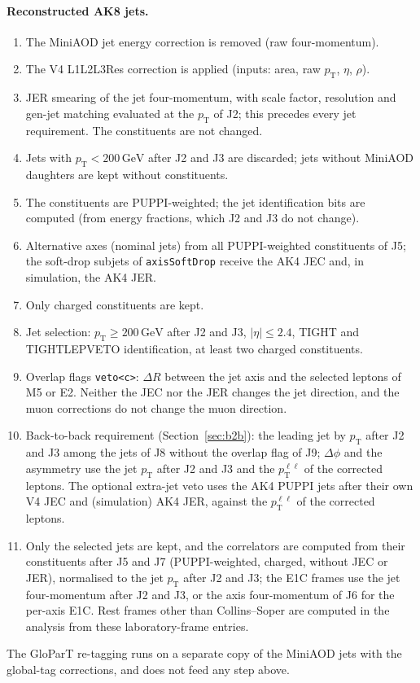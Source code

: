 \documentclass[11pt]{article}
\newcommand{\pt}{p_{\mathrm{T}}}
\newcommand{\GeV}{\ensuremath{\,\mathrm{GeV}}}
\newcommand{\ptll}{\pt^{\ell\ell}}
\newcommand{\code}[1]{\texttt{#1}}
\begin{document}
\paragraph{Reconstructed AK8 jets.}
\begin{enumerate}[label=J\arabic*.]
\item The MiniAOD jet energy correction is removed (raw four-momentum).
\item The V4 L1L2L3Res correction is applied (inputs: area, raw $\pt$, $\eta$, $\rho$).
\item JER smearing of the jet four-momentum, with scale factor, resolution and gen-jet matching evaluated at the $\pt$
  of J2; this precedes every jet requirement. The constituents are not changed.
\item Jets with $\pt < 200\GeV$ after J2 and J3 are discarded; jets without MiniAOD daughters are kept without
  constituents.
\item The constituents are PUPPI-weighted; the jet identification bits are computed (from energy fractions, which J2
  and J3 do not change).
\item Alternative axes (nominal jets) from all PUPPI-weighted constituents of J5; the soft-drop subjets of
  \code{axisSoftDrop} receive the AK4 JEC and, in simulation, the AK4 JER.
\item Only charged constituents are kept.
\item Jet selection: $\pt \geq 200\GeV$ after J2 and J3, $|\eta| \leq 2.4$, TIGHT and TIGHTLEPVETO identification, at
  least two charged constituents.
\item Overlap flags \code{veto<c>}: $\Delta R$ between the jet axis and the selected leptons of M5 or E2. Neither the
  JEC nor the JER changes the jet direction, and the muon corrections do not change the muon direction.
\item Back-to-back requirement (Section~\ref{sec:b2b}): the leading jet by $\pt$ after J2 and J3 among the jets of J8
  without the overlap flag of J9; $\Delta\phi$ and the asymmetry use the jet $\pt$ after J2 and J3 and the $\ptll$ of
  the corrected leptons. The optional extra-jet veto uses the AK4 PUPPI jets after their own V4 JEC and (simulation)
  AK4 JER, against the $\ptll$ of the corrected leptons.
\item Only the selected jets are kept, and the correlators are computed from their constituents after J5 and J7
  (PUPPI-weighted, charged, without JEC or JER), normalised to the jet $\pt$ after J2 and J3; the E1C frames use the jet
  four-momentum after J2 and J3, or the axis four-momentum of J6 for the per-axis E1C. Rest frames other than
  Collins--Soper are computed in the analysis from these laboratory-frame entries.
\end{enumerate}
The GloParT re-tagging runs on a separate copy of the MiniAOD jets with the global-tag corrections, and does not
feed any step above.
\end{document}
